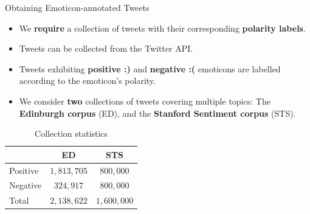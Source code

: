 \documentclass[handout]{beamer}
\begin{document}
\begin{frame}{Obtaining Emoticon-annotated Tweets}
\begin{scriptsize}
\begin{itemize}
\item We \textbf{require} a collection of tweets with their corresponding \textbf{polarity labels}. 
\item Tweets can be collected from the Twitter API.
\item Tweets exhibiting \textbf{positive :)} and \textbf{negative :(} emoticons are labelled according to the emoticon's polarity.
\item We consider \textbf{two}  collections of tweets covering multiple topics: The \textbf{Edinburgh corpus} (ED), and the \textbf{Stanford Sentiment corpus} (STS).
\end{itemize}

\begin{table}[htbp]
\begin{center}
\begin{tabular}{l|c|c}
\hline
 & ED & STS \\ \hline
Positive & $1,813,705$ & $800,000$  \\ 
Negative & $324,917$ & $800,000$  \\ \hline
Total & $2,138,622$ & $1,600,000$ \\ 
\end{tabular}
\end{center}
\caption{Collection statistics}
\label{tab:colstats}
\end{table}
\end{scriptsize}

\end{frame}
\end{document}
